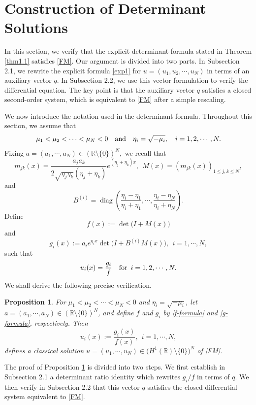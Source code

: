 \documentclass[11pt]{article}
\numberwithin{equation}{section}
\newtheorem{proposition}[theorem]{Proposition}
\newcommand{\R}{{\mathbb{R}}}
\theoremstyle{definition}
\begin{document}
\section{Construction   of Determinant Solutions}
In this section, we verify that the explicit determinant formula stated in
Theorem \ref{thm1.1} satisfies \eqref{FM}. Our argument is divided into two
parts. In Subsection 2.1,  we rewrite the explicit formula \eqref{exp1} for
\(u=(u_1,u_2,\cdots,u_N)\) in terms of an auxiliary vector \(q\). In
Subsection 2.2, we use this vector formulation to verify the differential
equation. The key point is that the auxiliary vector \(q\) satisfies a closed second-order
system, which is equivalent to \eqref{FM} after a simple rescaling.


We now introduce the notation used in the determinant formula. Throughout this section, we assume that
\[
\mu_1<\mu_2<\cdots<\mu_N<0
\quad\hbox{and}\quad
\eta_i=\sqrt{-\mu_i},\quad i=1,2,\cdots,N.
\]
Fixing
$
a=(a_1,\cdots,a_N)\in(\mathbb R\setminus\{0\})^N,
$
we recall that
\[
m_{jk}(x)
=
\frac{a_j a_k}{2\sqrt{\eta_j\eta_k}(\eta_j+\eta_k)}
e^{(\eta_j+\eta_k)x},
\ \
M(x)=(m_{jk}(x))_{1\le j,k\le N},
\]
and
\[
B^{(i)}
=
\operatorname{diag}\left(
\frac{\eta_i-\eta_1}{\eta_i+\eta_1},
\cdots,
\frac{\eta_i-\eta_N}{\eta_i+\eta_N}
\right).
\]
Define
\begin{equation}\label{f-formula}
	f(x):=\det\bigl(I+M(x)\bigr)
\end{equation}
and
\begin{equation}\label{g-formula}
	g_i(x):=a_i e^{\eta_i x}\det\bigl(I+B^{(i)}M(x)\bigr),
	\ \  i=1,\cdots,N,
\end{equation}
such that
\[
u_i(x)=\frac{g_i}{f}\quad\hbox{for}\,\ i=1,2,\cdots,N.
\]
We shall derive the following precise verification.



\begin{proposition}\label{prop:determinant-verification}
For
$\mu_1<\mu_2<\cdots<\mu_N<0$ and $\eta_i=\sqrt{-\mu_i}$, let \(a=(a_1,\cdots,a_N)\in(\R\setminus\{0\})^N\), and define \(f\) and \(g_i\)
by \eqref{f-formula} and \eqref{g-formula}, respectively. Then
\[
u_i(x):=\frac{g_i(x)}{f(x)},\ \  i=1,\cdots,N,
\]
defines a classical solution $u=(u_1,\cdots,u_N)\in \big(H^1(\R)\setminus\{0\}\big)^N$ of \eqref{FM}.
\end{proposition}

The proof of Proposition \ref{prop:determinant-verification} is divided into two steps.  We first establish in Subsection 2.1 a determinant
ratio identity which rewrites \(g_i/f\) in terms of \(q\).  We then verify in Subsection 2.2
that this vector \(q\) satisfies the closed differential system equivalent
to \eqref{FM}.
\end{document}
